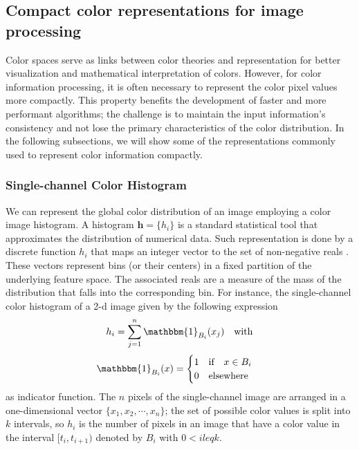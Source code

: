 \subsection{Compact color representations for image processing}

Color spaces serve as links between color theories and representation for better visualization and mathematical interpretation of colors. However, for color information processing, it is often necessary to represent the color pixel values more compactly. This property benefits the development of faster and more performant algorithms; the challenge is to maintain the input information's consistency and not lose the primary characteristics of the color distribution. In the following subsections, we will show some of the representations commonly used to represent color information compactly.

\subsubsection{Single-channel Color Histogram}
We can represent the global color distribution of an image employing a color image histogram. A histogram $\mathbf{h}= \{h_i\}$ is a standard statistical tool that approximates the distribution of numerical data. Such representation is done by a discrete function $h_i$ that maps an integer vector to the set of non-negative reals \citep{Scott:Book:2008}. These vectors represent bins (or their centers) in a fixed partition of the underlying feature space. The associated reals are a measure of the mass of the distribution that falls into the corresponding bin. For instance, the single-channel color histogram of a 2-d image given by the following expression
\begin{equation}\label{eq:single_channel_histogram}
    h_i = \sum_{j=1}^{n}  \mathbbm{1}_{B_i}(x_j) \quad \textrm{with} 
\end{equation}
\begin{equation}\nonumber
    \mathbbm{1}_{B_i}(x) = 
    \begin{cases} 
      1 \quad \textrm{if} \quad x \in B_i \\
      0 \quad \textrm{elsewhere}        
   	 \end{cases} 
\end{equation}
as indicator function. The $n$ pixels of the single-channel image are arranged in a one-dimensional vector $\{x_1, x_2, \cdots, x_n\}$; the set of possible color values is split into $k$ intervals, so $h_i$ is the number of pixels in an image that have a color value in the interval $[t_i, t_{i+1})$ denoted by $B_i$ with $0 < i leq k$.


